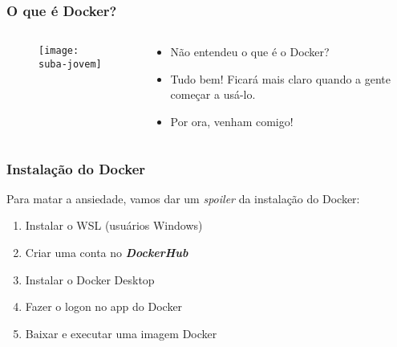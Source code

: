 \documentclass[t, 10pt, aspectratio=169, table, x11names]{beamer}
\begin{document}
	\begin{frame}
		\frametitle{O que é Docker?}
		\begin{columns}[t]
			\begin{column}{0.50\textwidth}
				\vspace{3mm}
				\begin{figure}[h]
					\texttt{[image: suba-jovem]}
				\end{figure}
			\end{column}
			\begin{column}{0.55\textwidth}
				\vspace{7mm}
				\begin{itemize}
					\large
					\item[] Não entendeu o que é o Docker?
					\vspace{3mm}
					\item[] Tudo bem! Ficará mais claro quando a gente começar a usá-lo.
					\vspace{3mm}
					\item[] Por ora, venham comigo!
				\end{itemize}
			\end{column}
			\begin{column}{0.05\textwidth}
			\end{column}
		\end{columns}
	\end{frame}

	\begin{frame}
		\frametitle{Instalação do Docker}
		Para matar a ansiedade, vamos dar um \textit{spoiler} da instalação do Docker:
		\begin{enumerate}
			\item Instalar o WSL (usuários Windows)
			\item Criar uma conta no \textit\textbf{DockerHub}
			\item Instalar o Docker Desktop
			\item Fazer o logon no app do Docker
			\item Baixar e executar uma imagem Docker 
		\end{enumerate}
	\end{frame}
\end{document}
